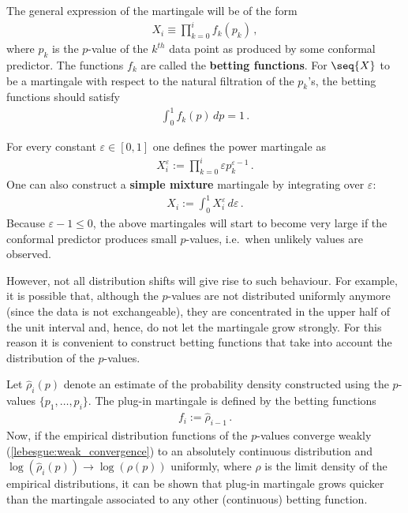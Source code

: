    The general expression of the martingale will be of the form
    \begin{gather}
        X_i\equiv\prod_{k=0}^if_k(p_k)\,,
    \end{gather}
    where $p_k$ is the $p$-value of the $k^{th}$ data point as produced by some conformal predictor. The functions $f_k$ are called the \textbf{betting functions}. For $\seq{X}$ to be a martingale with respect to the natural filtration of the $p_k$'s, the betting functions should satisfy
    \begin{gather}
        \int_0^1f_k(p)\,dp = 1\,.
    \end{gather}

    \begin{method}
        For every constant $\varepsilon\in[0,1]$ one defines the power martingale as
        \begin{gather}
            X^\varepsilon_i := \prod_{k=0}^i\varepsilon p^{\varepsilon-1}_k\,.
        \end{gather}
        One can also construct a \textbf{simple mixture} martingale by integrating over $\varepsilon$:
        \begin{gather}
            X_i := \int_0^1X^\varepsilon_i\,d\varepsilon\,.
        \end{gather}
        Because $\varepsilon-1\leq0$, the above martingales will start to become very large if the conformal predictor produces small $p$-values, i.e.~when unlikely values are observed.
    \end{method}
    However, not all distribution shifts will give rise to such behaviour. For example, it is possible that, although the $p$-values are not distributed uniformly anymore (since the data is not exchangeable), they are concentrated in the upper half of the unit interval and, hence, do not let the martingale grow strongly. For this reason it is convenient to construct betting functions that take into account the distribution of the $p$-values.
    \begin{method}
        Let $\widehat{\rho}_i(p)$ denote an estimate of the probability density constructed using the $p$-values $\{p_1,\ldots,p_i\}$. The plug-in martingale is defined by the betting functions
        \begin{gather}
            f_i := \widehat{\rho}_{i-1}\,.
        \end{gather}
        Now, if the empirical distribution functions of the $p$-values converge weakly (\cref{lebesgue:weak_convergence}) to an absolutely continuous distribution and $\log(\widehat{\rho}_i(p))\longrightarrow\log(\rho(p))$ uniformly, where $\rho$ is the limit density of the empirical distributions, it can be shown that plug-in martingale grows quicker than the martingale associated to any other (continuous) betting function.
    \end{method}

